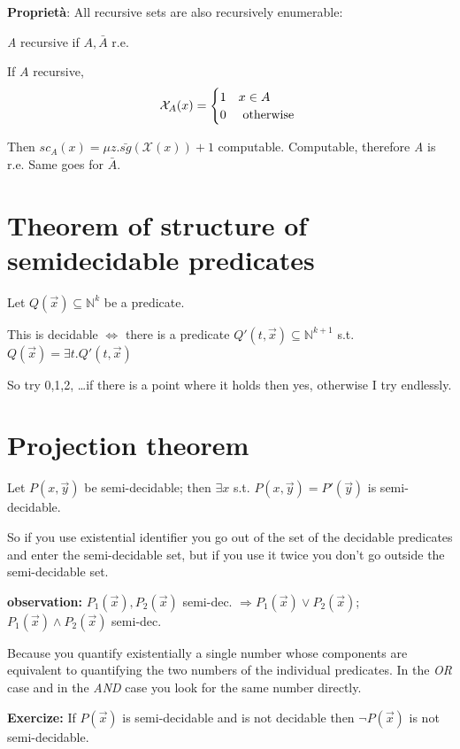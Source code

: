 \documentclass{amsbook}
\newcommand{\nat}{\ensuremath{\mathbb{N}}}
\theoremstyle{definition}
\theoremstyle{remark}
\numberwithin{section}{chapter}
\numberwithin{equation}{chapter}
\begin{document}
\textbf{Proprietà}: All recursive sets are also recursively enumerable:

\textit{A} recursive if $ A, \bar{A} $ r.e.

If $A$ recursive, \begin{equation*}
	\mathcal{X}_A(x)=\begin{cases}
		1 & x\in A        \\
		0 & $ otherwise $
	\end{cases}
\end{equation*}

Then $ sc_A(x) = \mu z.\bar{sg}(\mathcal{X}(x)) + 1 $ computable. Computable, therefore \textit{A} is r.e. Same goes for $ \bar{A} $.

\section {Theorem of structure of semidecidable predicates}

Let $ Q(\vec{x}) \subseteq \nat^k $ be a predicate.

This is decidable $ \Leftrightarrow $ there is a predicate $ Q'(t,\vec{x}) \subseteq \nat^{k+1} $ s.t. $ Q(\vec{x}) = \exists t. Q'(t,\vec{x}) $

So try 0,1,2, \dots if there is a point where it holds then yes, otherwise I try endlessly.

\section {Projection theorem}

Let $ P(x,\vec{y}) $ be semi-decidable; then $ \exists x $ s.t. $ P(x,\vec{y}) = P'(\vec{y})$ is semi-decidable.

So if you use existential identifier you go out of the set of the decidable predicates and enter the semi-decidable set, but if you use it twice you don't go outside the semi-decidable set.

\textbf{observation:} $ P_1(\vec{x}), P_2(\vec{x}) $ semi-dec. $ \Rightarrow P_1(\vec{x}) \lor P_2(\vec{x}) $; $ P_1(\vec{x}) \land P_2(\vec{x}) $ semi-dec.

Because you quantify existentially a single number whose components are equivalent to quantifying the two numbers of the individual predicates. In the \textit{OR} case and in the \textit{AND} case you look for the same number directly.

\textbf{Exercize:} If $ P(\vec{x}) $ is semi-decidable and is not decidable then $ \lnot P(\vec{x}) $ is not semi-decidable.
\end{document}
